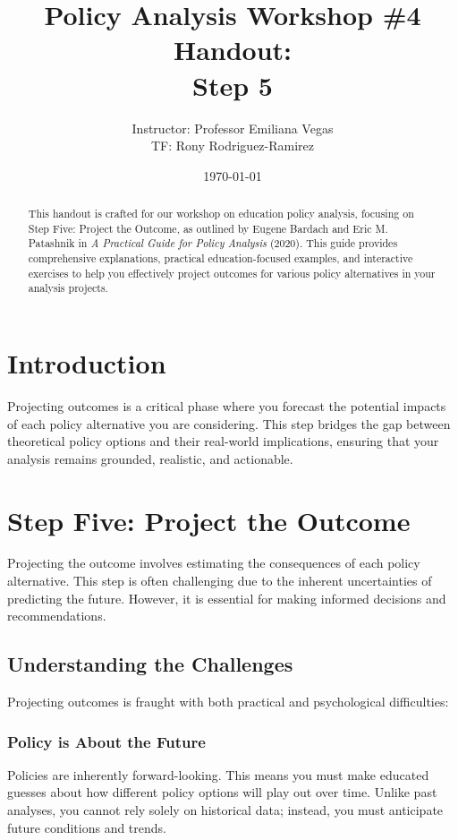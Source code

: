 \documentclass{article}
\title{Policy Analysis Workshop \#4 Handout:\\Step 5}
\author{Instructor: Professor Emiliana Vegas \\ TF: Rony Rodriguez-Ramirez}
\date{\today}
\theoremstyle{definition}
\theoremstyle{plain}
\begin{document}
\maketitle

\begin{abstract}
This handout is crafted for our workshop on education policy analysis, focusing on Step Five: Project the Outcome, as outlined by Eugene Bardach and Eric M. Patashnik in \textit{A Practical Guide for Policy Analysis} (2020). This guide provides comprehensive explanations, practical education-focused examples, and interactive exercises to help you effectively project outcomes for various policy alternatives in your analysis projects.
\end{abstract}

\section{Introduction}

Projecting outcomes is a critical phase where you forecast the potential impacts of each policy alternative you are considering. This step bridges the gap between theoretical policy options and their real-world implications, ensuring that your analysis remains grounded, realistic, and actionable.

\section{Step Five: Project the Outcome}

Projecting the outcome involves estimating the consequences of each policy alternative. This step is often challenging due to the inherent uncertainties of predicting the future. However, it is essential for making informed decisions and recommendations.

\subsection{Understanding the Challenges}

Projecting outcomes is fraught with both practical and psychological difficulties:

\subsubsection{Policy is About the Future}

Policies are inherently forward-looking. This means you must make educated guesses about how different policy options will play out over time. Unlike past analyses, you cannot rely solely on historical data; instead, you must anticipate future conditions and trends.
\end{document}
